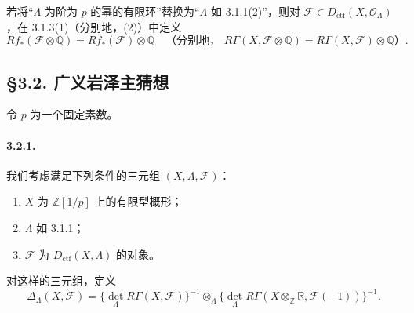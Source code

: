若将“$\Lambda$ 为阶为 $p$ 的幂的有限环”替换为“$\Lambda$ 如 3.1.1(2)”，则对 $\mathcal F\in D_{\mathrm{ctf}}(X,\mathcal O_\Lambda)$，在 3.1.3(1)（分别地，(2)）中定义
\[
 Rf_*(\mathcal F\otimes\mathbb Q)=Rf_*(\mathcal F)\otimes\mathbb Q
 \quad\text{（分别地， }R\Gamma(X,\mathcal F\otimes\mathbb Q)=R\Gamma(X,\mathcal F)\otimes\mathbb Q\text{）}.
\]

\subsection*{§3.2. 广义岩泽主猜想}
令 $p$ 为一个固定素数。

\paragraph{3.2.1.} 我们考虑满足下列条件的三元组 $(X,\Lambda,\mathcal F)$：
\begin{enumerate}[label=(\roman*)]
\item $X$ 为 $\mathbb Z[1/p]$ 上的有限型概形；
\item $\Lambda$ 如 3.1.1；
\item $\mathcal F$ 为 $D_{\mathrm{ctf}}(X,\Lambda)$ 的对象。
\end{enumerate}
对这样的三元组，定义
\[
 \Delta_\Lambda(X,\mathcal F)
 =\{\det_\Lambda R\Gamma(X,\mathcal F)\}^{-1}
 \otimes_\Lambda
 \{\det_\Lambda R\Gamma(X\otimes_{\mathbb Z}\mathbb R,\mathcal F(-1))\}^{-1}.
\]

